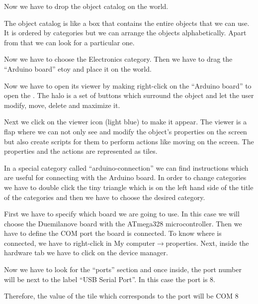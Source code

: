 \documentclass[english]{etoys-guide}
\begin{document}

Now we have to drop the object catalog on the world. 


The object catalog is like a box that contains the entire objects that we can
use. It is ordered by categories but we can arrange the objects alphabetically.
Apart from that we can look for a particular one.

Now we have to choose the Electronics category. Then we have to drag the
“Arduino board” etoy and place it on the world.

  
Now we have to open its viewer by making right-click on the “Arduino board” to
open the . The halo is a set of buttons which surround the object and let
the user modify, move, delete and maximize it.  

Next we click on the viewer icon (light blue) to make it appear. The viewer is
a flap where we can not only see and modify the object’s properties on the
screen but also create scripts for them to perform actions like moving on the
screen. The properties and the actions are represented as tiles.



In a special category called “arduino-connection” we can find instructions
which are useful for connecting with the Arduino board. In order to change
categories we have to double click the tiny triangle which is on the left hand
side of the title of the categories and then we have to choose the desired
category. 


First we have to specify which board we are going to use.  In this case we will
choose the Duemilanove board with the ATmega328 microcontroller. Then we have
to define the COM port the board is connected. To know where is connected, we
have to right-click in My computer$\rightarrow$properties. Next, inside the
hardware tab we have to click on the device manager. 


Now we have to look for the “ports” section and once inside, the port number
will be next to the label “USB Serial Port”. In this case the port is 8. 
 

Therefore, the value of the tile which corresponds to the port will be COM 8
\end{document}
